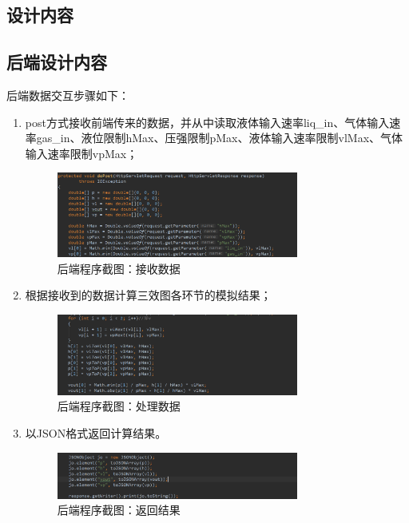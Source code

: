 \documentclass[a4paper]{ctexart}
\begin{document}
\begin{spacing}{1.25}
\newpage
\section{设计内容}
\subsection{后端设计内容}
后端数据交互步骤如下：

\begin{enumerate}
	\item post方式接收前端传来的数据，并从中读取液体输入速率liq\_in、气体输入速率gas\_in、液位限制hMax、压强限制pMax、液体输入速率限制vlMax、气体输入速率限制vpMax；
	\begin{figure}[htbp]
		\centering
		\includegraphics [width=0.75\textwidth]{figure//back1.png}
		\caption{后端程序截图：接收数据}
	\end{figure}
	\item 根据接收到的数据计算三效图各环节的模拟结果；
	\begin{figure}[htbp]
		\centering
		\includegraphics [width=0.75\textwidth]{figure//back2.png}
		\caption{后端程序截图：处理数据}
	\end{figure}
	\item 以JSON格式返回计算结果。
	\begin{figure}[htbp]
		\centering
		\includegraphics [width=0.75\textwidth]{figure//back3.png}
		\caption{后端程序截图：返回结果}
	\end{figure}
\end{enumerate}


\end{spacing}
\end{document}
